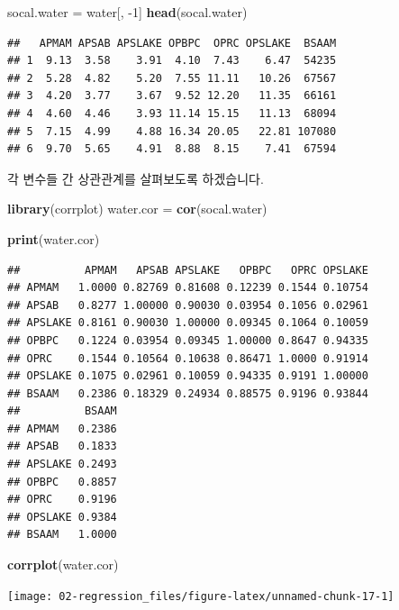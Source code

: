 \documentclass[12pt,]{book}
\newenvironment{Shaded}{\begin{snugshade}}{\end{snugshade}}
\newcommand{\DecValTok}[1]{\textcolor[rgb]{0.00,0.00,0.81}{#1}}
\newcommand{\KeywordTok}[1]{\textcolor[rgb]{0.13,0.29,0.53}{\textbf{#1}}}
\newcommand{\NormalTok}[1]{#1}
\newcommand{\StringTok}[1]{\textcolor[rgb]{0.31,0.60,0.02}{#1}}
\begin{document}
\begin{Shaded}
\begin{Highlighting}[]
\NormalTok{socal.water =}\StringTok{ }\NormalTok{water[, }\DecValTok{-1}\NormalTok{]}
\KeywordTok{head}\NormalTok{(socal.water)}
\end{Highlighting}
\end{Shaded}

\begin{verbatim}
##   APMAM APSAB APSLAKE OPBPC  OPRC OPSLAKE  BSAAM
## 1  9.13  3.58    3.91  4.10  7.43    6.47  54235
## 2  5.28  4.82    5.20  7.55 11.11   10.26  67567
## 3  4.20  3.77    3.67  9.52 12.20   11.35  66161
## 4  4.60  4.46    3.93 11.14 15.15   11.13  68094
## 5  7.15  4.99    4.88 16.34 20.05   22.81 107080
## 6  9.70  5.65    4.91  8.88  8.15    7.41  67594
\end{verbatim}

각 변수들 간 상관관계를 살펴보도록 하겠습니다.

\begin{Shaded}
\begin{Highlighting}[]
\KeywordTok{library}\NormalTok{(corrplot)}
\NormalTok{water.cor =}\StringTok{ }\KeywordTok{cor}\NormalTok{(socal.water)}

\KeywordTok{print}\NormalTok{(water.cor)}
\end{Highlighting}
\end{Shaded}

\begin{verbatim}
##          APMAM   APSAB APSLAKE   OPBPC   OPRC OPSLAKE
## APMAM   1.0000 0.82769 0.81608 0.12239 0.1544 0.10754
## APSAB   0.8277 1.00000 0.90030 0.03954 0.1056 0.02961
## APSLAKE 0.8161 0.90030 1.00000 0.09345 0.1064 0.10059
## OPBPC   0.1224 0.03954 0.09345 1.00000 0.8647 0.94335
## OPRC    0.1544 0.10564 0.10638 0.86471 1.0000 0.91914
## OPSLAKE 0.1075 0.02961 0.10059 0.94335 0.9191 1.00000
## BSAAM   0.2386 0.18329 0.24934 0.88575 0.9196 0.93844
##          BSAAM
## APMAM   0.2386
## APSAB   0.1833
## APSLAKE 0.2493
## OPBPC   0.8857
## OPRC    0.9196
## OPSLAKE 0.9384
## BSAAM   1.0000
\end{verbatim}

\begin{Shaded}
\begin{Highlighting}[]
\KeywordTok{corrplot}\NormalTok{(water.cor)}
\end{Highlighting}
\end{Shaded}

\begin{center}\texttt{[image: 02-regression\_files/figure-latex/unnamed-chunk-17-1]} \end{center}
\end{document}

